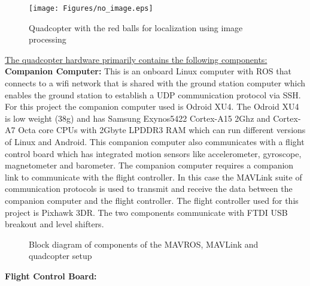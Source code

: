 \documentclass{article}
\begin{document}
\begin{figure}[H]
\centering
\texttt{[image: Figures/no\_image.eps]}
\caption{Quadcopter with the red balls for localization using image processing}
\label{quad_red_balls}
\end{figure}


\underline{The quadcopter hardware primarily contains the following components:}\\
\textbf{Companion Computer:} This is an onboard Linux computer with ROS that connects to a wifi network that is shared with the ground station computer which enables the ground station to establish a UDP communication protocol via SSH. For this project the companion computer used is Odroid XU4. The Odroid XU4 is low weight (38g) and has Samsung Exynos5422 Cortex-A15 2Ghz and Cortex-A7 Octa core CPUs with 2Gbyte LPDDR3 RAM which can run different versions of Linux and Android. This companion computer also communicates with a flight control board which has integrated motion sensors like accelerometer, gyroscope, magnetometer and barometer. The companion computer requires a companion link to communicate with the flight controller. In this case the MAVLink suite of communication protocols is used to transmit and receive the data between the companion computer and the flight controller. The flight controller used for this project is Pixhawk 3DR. The two components communicate with FTDI USB breakout and level shifters. 
\begin{figure}
\centerline{}
\caption{Block diagram of components of the MAVROS, MAVLink and quadcopter setup}
\label{offboard_control_ros_EPS}
\end{figure}
\textbf{Flight Control Board:} 
\end{document}
